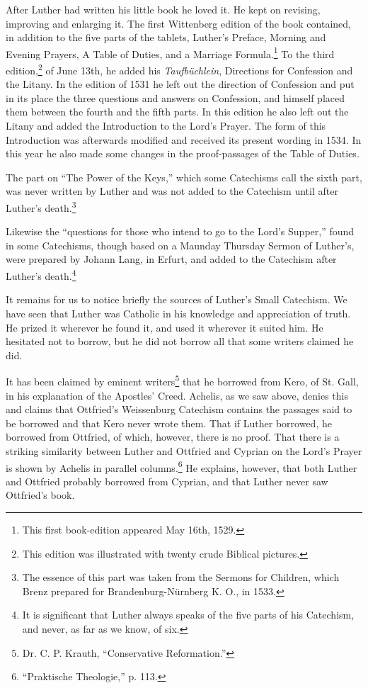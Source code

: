 After Luther had written his little book he loved
it. He kept on revising, improving and enlarging it. The first Wittenberg edition of the book contained, in addition to the five parts of the tablets, Luther’s Preface, Morning and Evening Prayers, A Table of Duties, and a Marriage Formula.\footnote{This first book-edition appeared May 16th, 1529.} To the third edition,\footnote{This edition was illustrated with twenty crude Biblical pictures.} of June 13th, he added his \emph{Taufbüchlein}, Directions for Confession and the Litany. In the edition of 1531 he left out the direction of Confession and put in its place the three questions and answers on Confession, and himself placed them between the fourth and the fifth parts. In this edition he also left out the Litany and added the Introduction to the Lord’s Prayer. The form of this Introduction was afterwards modified and received its present wording in 1534. In this year he also made some changes in the proof-passages of the Table of Duties.


The part on “The Power of the Keys,” which some Catechisms call the sixth part, was never written by Luther and was not added to the Catechism until after Luther’s death.\footnote{The essence of this part was taken from the Sermons for Children, which Brenz prepared for Brandenburg-Nürnberg K. O., in 1533.} 


Likewise the “questions for those who intend to go to the Lord’s Supper,” found in some Catechisms, though based on a Maunday Thursday Sermon
of Luther’s, were prepared by Johann Lang, in Erfurt, and added to the Catechism after Luther’s death.\footnote{It is significant that Luther always speaks of the five parts of his Catechism, and never, as far as we know, of six.}

 It remains for us to notice briefly the sources of Luther’s Small Catechism. We have seen that Luther was Catholic in his knowledge and appreciation of truth. He prized it wherever he found it, and used it wherever it suited him. He hesitated not to borrow, but he did not borrow all that some writers claimed he did.

It has been claimed by eminent writers\footnote{Dr. C. P. Krauth, “Conservative Reformation.”} that he borrowed from Kero, of St. Gall, in his explanation of the Apostles’ Creed. Achelis, as we saw above, denies this and claims that Ottfried’s Weissenburg Catechism contains the passages said to be borrowed and that Kero never wrote them. That if Luther borrowed, he borrowed from Ottfried, of which, however, there is no proof. That there is a striking similarity between Luther and Ottfried and Cyprian on the Lord’s Prayer is shown by Achelis in parallel columns.\footnote{“Praktische Theologie,” p. 113.} He explains, however, that both Luther and Ottfried probably borrowed from Cyprian, and that Luther never saw Ottfried’s book.

